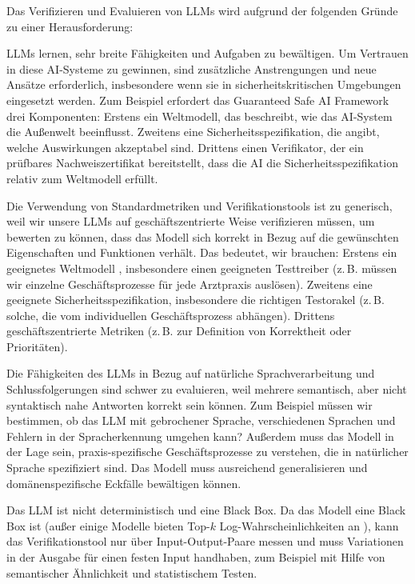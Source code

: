 \documentclass[twocolumn]{article}
\begin{document}
Das Verifizieren und Evaluieren von LLMs wird aufgrund der folgenden Gründe zu einer Herausforderung:
\begin{compactitem}
\item LLMs lernen, sehr breite Fähigkeiten und Aufgaben zu bewältigen. Um Vertrauen in diese AI-Systeme zu gewinnen, sind zusätzliche Anstrengungen und neue Ansätze erforderlich, insbesondere wenn sie in sicherheitskritischen Umgebungen eingesetzt werden. Zum Beispiel erfordert das Guaranteed Safe AI Framework \cite{Dalrymple24} drei Komponenten: Erstens ein Weltmodell, das beschreibt, wie das AI-System die Außenwelt beeinflusst. Zweitens eine Sicherheitsspezifikation, die angibt, welche Auswirkungen akzeptabel sind. Drittens einen Verifikator, der ein prüfbares Nachweiszertifikat bereitstellt, dass die AI die Sicherheitsspezifikation relativ zum Weltmodell erfüllt.
\item Die Verwendung von Standardmetriken und Verifikationstools \cite{Chang24} ist zu generisch, weil wir unsere LLMs auf geschäftszentrierte Weise verifizieren müssen, um bewerten zu können, dass das Modell sich korrekt in Bezug auf die gewünschten Eigenschaften und Funktionen verhält. Das bedeutet, wir brauchen: Erstens ein geeignetes Weltmodell \cite{Dalrymple24}, insbesondere einen geeigneten Testtreiber (z.\,B. müssen wir einzelne Geschäftsprozesse für jede Arztpraxis auslösen). Zweitens eine geeignete Sicherheitsspezifikation, insbesondere die richtigen Testorakel (z.\,B. solche, die vom individuellen Geschäftsprozess abhängen). Drittens geschäftszentrierte Metriken (z.\,B. zur Definition von Korrektheit oder Prioritäten).
\item Die Fähigkeiten des LLMs in Bezug auf natürliche Sprachverarbeitung und Schlussfolgerungen sind schwer zu evaluieren, weil mehrere semantisch, aber nicht syntaktisch nahe Antworten korrekt sein können. Zum Beispiel müssen wir bestimmen, ob das LLM mit gebrochener Sprache, verschiedenen Sprachen und Fehlern in der Spracherkennung umgehen kann? Außerdem muss das Modell in der Lage sein, praxis-spezifische Geschäftsprozesse zu verstehen, die in natürlicher Sprache spezifiziert sind. Das Modell muss ausreichend generalisieren und domänenspezifische Eckfälle bewältigen können.
\item Das LLM ist nicht deterministisch und eine Black Box. Da das Modell eine Black Box ist (außer einige Modelle bieten Top-$k$ Log-Wahrscheinlichkeiten an \cite{Vaswani17}), kann das Verifikationstool nur über Input-Output-Paare messen und muss Variationen in der Ausgabe für einen festen Input handhaben, zum Beispiel mit Hilfe von semantischer Ähnlichkeit und statistischem Testen.
\end{compactitem}
\end{document}
